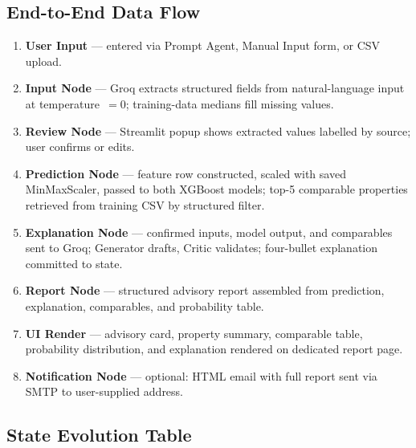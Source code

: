 \documentclass[12pt,a4paper]{article}
\begin{document}
\subsection{End-to-End Data Flow}

\begin{enumerate}[label=\arabic*., leftmargin=*, itemsep=4pt]
  \item \textbf{User Input} --- entered via Prompt Agent, Manual Input form, or CSV upload.
  \item \textbf{Input Node} --- Groq extracts structured fields from natural-language input at temperature~$= 0$; training-data medians fill missing values.
  \item \textbf{Review Node} --- Streamlit popup shows extracted values labelled by source; user confirms or edits.
  \item \textbf{Prediction Node} --- feature row constructed, scaled with saved MinMaxScaler, passed to both XGBoost models; top-5 comparable properties retrieved from training CSV by structured filter.
  \item \textbf{Explanation Node} --- confirmed inputs, model output, and comparables sent to Groq; Generator drafts, Critic validates; four-bullet explanation committed to state.
  \item \textbf{Report Node} --- structured advisory report assembled from prediction, explanation, comparables, and probability table.
  \item \textbf{UI Render} --- advisory card, property summary, comparable table, probability distribution, and explanation rendered on dedicated report page.
  \item \textbf{Notification Node} --- optional: HTML email with full report sent via SMTP to user-supplied address.
\end{enumerate}

\subsection{State Evolution Table}
\end{document}
